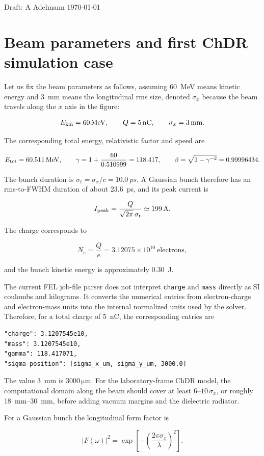 \documentclass[a4paper,11pt]{article}
\begin{document}
Draft: A Adelmann \today
\section{Beam parameters and first ChDR simulation case}

Let us fix the beam parameters as follows, assuming \SI{60}{MeV} means kinetic energy and \SI{3}{mm} means the longitudinal rms size, denoted $\sigma_x$ because the beam travels along the $x$ axis in the figure:

\[
  E_{\rm kin}=\SI{60}{MeV},\qquad Q=\SI{5}{nC},\qquad
  \sigma_x=\SI{3}{mm}.
\]

The corresponding total energy, relativistic factor and speed are

\[
  E_{\rm tot}=\SI{60.511}{MeV},\qquad
  \gamma=1+\frac{60}{0.510999}=118.417,
  \qquad \beta=\sqrt{1-\gamma^{-2}}=0.99996434.
\]

The bunch duration is $\sigma_t=\sigma_x/c=\SI{10.0}{ps}$.  A Gaussian bunch therefore has an rms-to-FWHM duration of about \SI{23.6}{ps}, and its peak current is

\[
  I_{\rm peak}=\frac{Q}{\sqrt{2\pi}\,\sigma_t}
  \simeq \SI{199}{A}.
\]

The charge corresponds to

\[
  N_e=\frac{Q}{e}=3.12075\times10^{10}\ \text{electrons},
\]

and the bunch kinetic energy is approximately \SI{0.30}{J}.

The current FEL job-file parser does not interpret \texttt{charge} and \texttt{mass} directly as SI coulombs and kilograms.  It converts the numerical entries from electron-charge and electron-mass units into the internal normalized units used by the solver.  Therefore, for a total charge of \SI{5}{nC}, the corresponding entries are

\begin{verbatim}
"charge": 3.1207545e10,
"mass": 3.1207545e10,
"gamma": 118.417071,
"sigma-position": [sigma_x_um, sigma_y_um, 3000.0]
\end{verbatim}

The value \SI{3}{mm} is $3000\,\si{\micro\metre}$.  For the laboratory-frame ChDR model, the computational domain along the beam should cover at least $6$--$10\,\sigma_x$, or roughly \SIrange{18}{30}{mm}, before adding vacuum margins and the dielectric radiator.  

For a Gaussian bunch the longitudinal form factor is

\[
  |F(\omega)|^2=\exp\!\left[-\left(\frac{2\pi\sigma_x}{\lambda}\right)^2\right].
\]
\end{document}
